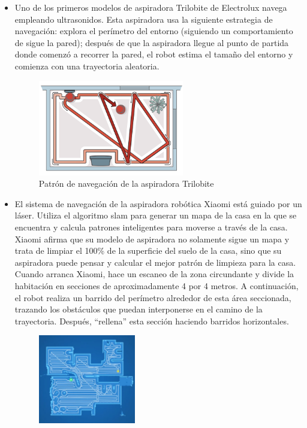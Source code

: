 \begin{itemize}
\item Uno de los primeros modelos de aspiradora Trilobite de Electrolux navega empleando ultrasonidos. Esta aspiradora usa la siguiente estrategia de navegación: explora el perímetro del entorno (siguiendo un comportamiento de sigue la pared); después de que la aspiradora llegue al punto de partida donde comenzó a recorrer la pared, el robot estima el tamaño del entorno y comienza con una trayectoria aleatoria.
\begin{figure}[H]
  \begin{center}
    \includegraphics[width=0.6\textwidth]{figures/Vacuum/Trilobite.png}
		\caption{Patrón de navegación de la aspiradora Trilobite}
		\label{fig.Trilobite}
		\end{center}
\end{figure}
\item El sistema de navegación de la aspiradora robótica Xiaomi está guiado por un láser. Utiliza el algoritmo \acrfull{slam} para generar un mapa de la casa en la que se encuentra y calcula patrones inteligentes para moverse a través de la casa. Xiaomi afirma que su modelo de aspiradora no solamente sigue un mapa y trata de limpiar el 100\% de la superficie del suelo de la casa, sino que su aspiradora puede pensar y calcular el mejor patrón de limpieza para la casa.  Cuando arranca Xiaomi, hace un escaneo de la zona circundante y divide la habitación en secciones de aproximadamente 4 por 4 metros. A continuación, el robot realiza un barrido del perímetro alrededor de esta área seccionada, trazando los obstáculos que puedan interponerse en el camino de la trayectoria. Después, ``rellena'' esta sección haciendo barridos horizontales.
\begin{figure}[H]
  \begin{center}
    \includegraphics[width=0.4\textwidth]{figures/Vacuum/Xiaomi.png}

\end{center}
\end{figure}
\end{itemize}
